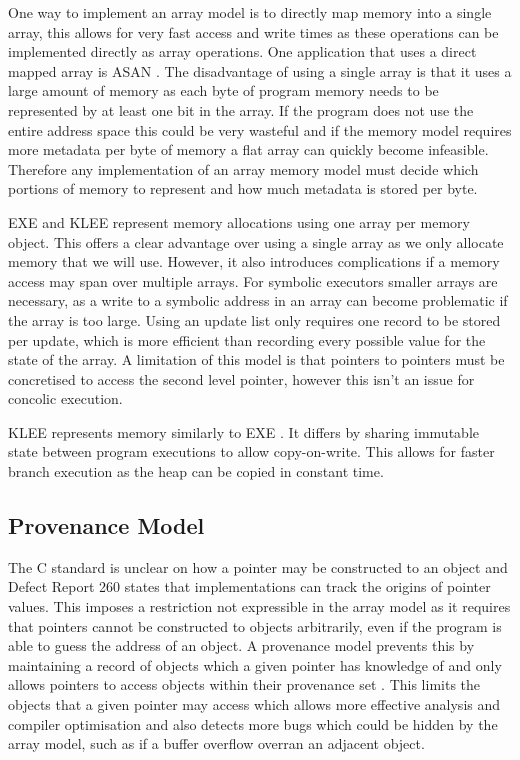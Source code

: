 \documentclass[12pt,twoside]{report}
\begin{document}
One way to implement an array model is to directly map memory into a single array, this allows for very fast access and write times as these operations can be implemented directly as array operations. One application that uses a direct mapped array is ASAN \cite{180957}. The disadvantage of using a single array is that it uses a large amount of memory as each byte of program memory needs to be represented by at least one bit in the array. If the program does not use the entire address space this could be very wasteful and if the memory model requires more metadata per byte of memory a flat array can quickly become infeasible. Therefore any implementation of an array memory model must decide which portions of memory to represent and how much metadata is stored per byte.

EXE \cite{cadar2008exe} and KLEE \cite{cadar2008klee} represent memory allocations using one array per memory object. This offers a clear advantage over using a single array as we only allocate memory that we will use. However, it also introduces complications if a memory access may span over multiple arrays. For symbolic executors smaller arrays are necessary, as a write to a symbolic address in an array can become problematic if the array is too large. Using an update list only requires one record to be stored per update, which is more efficient than recording every possible value for the state of the array. A limitation of this model is that pointers to pointers must be concretised to access the second level pointer, however this isn't an issue for concolic execution.

KLEE \cite{cadar2008klee} represents memory similarly to EXE \cite{cadar2008exe}. It differs by sharing immutable state between program executions to allow copy-on-write. This allows for faster branch execution as the heap can be copied in constant time.


\subsection{Provenance Model}
The C standard is unclear on how a pointer may be constructed to an object \cite{memarian2019exploring} and Defect Report 260 \cite{defectreport260} states that implementations can track the origins of pointer values. This imposes a restriction not expressible in the array model as it requires that pointers cannot be constructed to objects arbitrarily, even if the program is able to guess the address of an object. A provenance model prevents this by maintaining a record of objects which a given pointer has knowledge of and only allows pointers to access objects within their provenance set \cite{memarian2019exploring}. This limits the objects that a given pointer may access which allows more effective analysis and compiler optimisation and also detects more bugs which could be hidden by the array model, such as if a buffer overflow overran an adjacent object.
\end{document}
